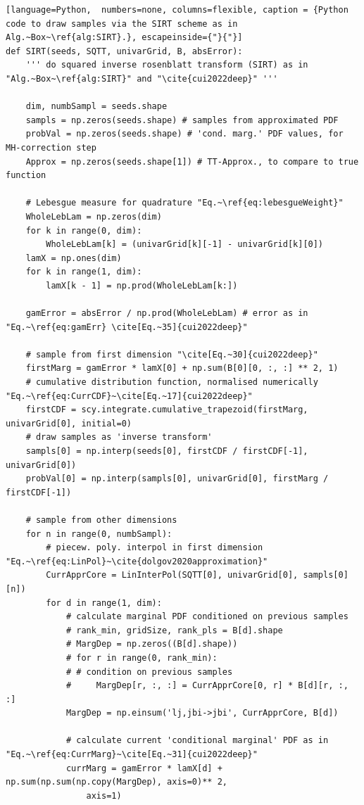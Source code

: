 \clearpage
\vspace*{-1cm}
\begin{lstlisting}[language=Python,	 numbers=none, columns=flexible, caption = {Python code to draw samples via the SIRT scheme as in Alg.~Box~\ref{alg:SIRT}.}, escapeinside={"}{"}]
def SIRT(seeds, SQTT, univarGrid, B, absError):
	''' do squared inverse rosenblatt transform (SIRT) as in "Alg.~Box~\ref{alg:SIRT}" and "\cite{cui2022deep}" '''
	
	dim, numbSampl = seeds.shape
	sampls = np.zeros(seeds.shape) # samples from approximated PDF
	probVal = np.zeros(seeds.shape) # 'cond. marg.' PDF values, for MH-correction step
	Approx = np.zeros(seeds.shape[1]) # TT-Approx., to compare to true function
	
	# Lebesgue measure for quadrature "Eq.~\ref{eq:lebesgueWeight}"
	WholeLebLam = np.zeros(dim)
	for k in range(0, dim):
		WholeLebLam[k] = (univarGrid[k][-1] - univarGrid[k][0])
	lamX = np.ones(dim)
	for k in range(1, dim):
		lamX[k - 1] = np.prod(WholeLebLam[k:])
	
	gamError = absError / np.prod(WholeLebLam) # error as in "Eq.~\ref{eq:gamErr} \cite[Eq.~35]{cui2022deep}"
	
	# sample from first dimension "\cite[Eq.~30]{cui2022deep}"
	firstMarg = gamError * lamX[0] + np.sum(B[0][0, :, :] ** 2, 1)
	# cumulative distribution function, normalised numerically "Eq.~\ref{eq:CurrCDF}~\cite[Eq.~17]{cui2022deep}"
	firstCDF = scy.integrate.cumulative_trapezoid(firstMarg, univarGrid[0], initial=0)
	# draw samples as 'inverse transform'
	sampls[0] = np.interp(seeds[0], firstCDF / firstCDF[-1], univarGrid[0])
	probVal[0] = np.interp(sampls[0], univarGrid[0], firstMarg / firstCDF[-1])
	
	# sample from other dimensions
	for n in range(0, numbSampl):
		# piecew. poly. interpol in first dimension "Eq.~\ref{eq:LinPol}~\cite{dolgov2020approximation}"
		CurrApprCore = LinInterPol(SQTT[0], univarGrid[0], sampls[0][n])
		for d in range(1, dim):
			# calculate marginal PDF conditioned on previous samples
			# rank_min, gridSize, rank_pls = B[d].shape
			# MargDep = np.zeros((B[d].shape))
			# for r in range(0, rank_min):
			# # condition on previous samples
			#     MargDep[r, :, :] = CurrApprCore[0, r] * B[d][r, :, :]
			MargDep = np.einsum('lj,jbi->jbi', CurrApprCore, B[d])
				
			# calculate current 'conditional marginal' PDF as in "Eq.~\ref{eq:CurrMarg}~\cite[Eq.~31]{cui2022deep}"
			currMarg = gamError * lamX[d] + np.sum(np.sum(np.copy(MargDep), axis=0)** 2,
				axis=1) 
			 

\end{lstlisting}
